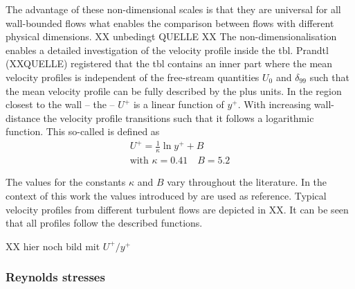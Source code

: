 The advantage of these non-dimensional scales is that they are universal for all wall-bounded flows what enables the comparison between flows with different physical dimensions. XX unbedingt QUELLE XX
The non-dimensionalisation enables a detailed investigation of the velocity profile inside the \acrshort{tbl}.
Prandtl (XXQUELLE) registered that the \acrshort{tbl} contains an inner part where the mean velocity profiles is independent of the free-stream quantities $U_0$ and $\delta_{99}$ such that the mean velocity profile can be fully described by the plus units.
In the region closest to the wall – the  – $U^+$ is a linear function of $y^+$. 
With increasing wall-distance the velocity profile transitions such that it follows a logarithmic function.
This so-called  is defined as 
\begin{gather}
    U^+ = \frac{1}{\kappa}\ln y^+ + B \\
    \text{with } \kappa = 0.41 \quad B = 5.2
\end{gather}

The values for the constants $\kappa$ and $B$ vary throughout the literature.
In the context of this work the values introduced by \citet{pope_turbulent_2015} are used as reference.
Typical velocity profiles from different turbulent flows are depicted in XX.
It can be seen that all profiles follow the described functions.

XX hier noch bild mit $U^+/y^+$


\subsubsection{Reynolds stresses}

